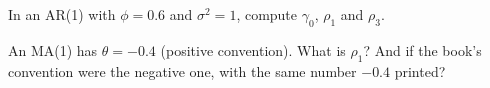 \begin{exercicio}
In an AR(1) with $\phi=0.6$ and $\sigma^2=1$, compute $\gamma_0$, $\rho_1$ and $\rho_3$.
\end{exercicio}

\begin{exercicio}
An MA(1) has $\theta=-0.4$ (positive convention). What is $\rho_1$? And if the book's convention were the negative one, with the same number $-0.4$ printed?
\end{exercicio}
